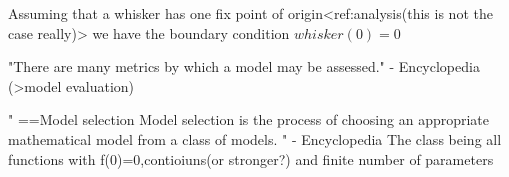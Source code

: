 Assuming that a whisker has one fix point of origin<ref:analysis(this is not
the case really)> we have the boundary condition $whisker(0)=0$

"There are many metrics by which a model may be assessed." - Encyclopedia
(>model evaluation)

"
==Model selection
Model selection is the process of choosing an appropriate mathematical model
from a class of models.
" - Encyclopedia 
The class being all functions with f(0)=0,contioiuns(or stronger?) and finite number of parameters


